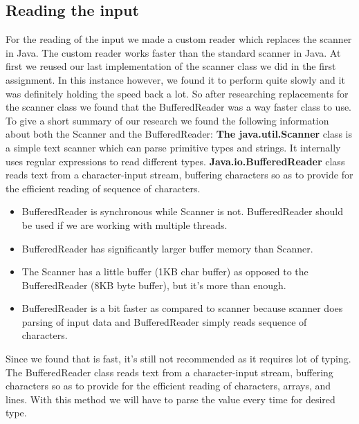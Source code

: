 \documentclass{article}
\begin{document}
\subsection{Reading the input}
For the reading of the input we made a custom reader which replaces the scanner in Java. The custom reader works faster than the standard scanner in Java. \newline
At first we reused our last implementation of the scanner class we did in the first assignment. In this instance however, we found it to perform quite slowly and it was definitely holding the speed back a lot. So after researching replacements for the scanner class we found that the BufferedReader was a way faster class to use. To give a short summary of our research we found the following information about both the Scanner and the BufferedReader:
\newline
\newline
\textbf{The java.util.Scanner} class is a simple text scanner which can parse primitive types and strings. It internally uses regular expressions to read different types.
\newline
\newline
\textbf{Java.io.BufferedReader} class reads text from a character-input stream, buffering characters so as to provide for the efficient reading of sequence of characters.
\begin{itemize}
\item BufferedReader is synchronous while Scanner is not. BufferedReader should be used if we are working with multiple threads.
\item BufferedReader has significantly larger buffer memory than Scanner.
\item The Scanner has a little buffer (1KB char buffer) as opposed to the BufferedReader (8KB byte buffer), but it’s more than enough.
\item BufferedReader is a bit faster as compared to scanner because scanner does parsing of input data and BufferedReader simply reads sequence of characters.
\end{itemize}
Since we found that is fast, it's still not recommended as it requires lot of typing. The BufferedReader class reads text from a character-input stream, buffering characters so as to provide for the efficient reading of characters, arrays, and lines. With this method we will have to parse the value every time for desired type.
\newline
\newline
\end{document}
